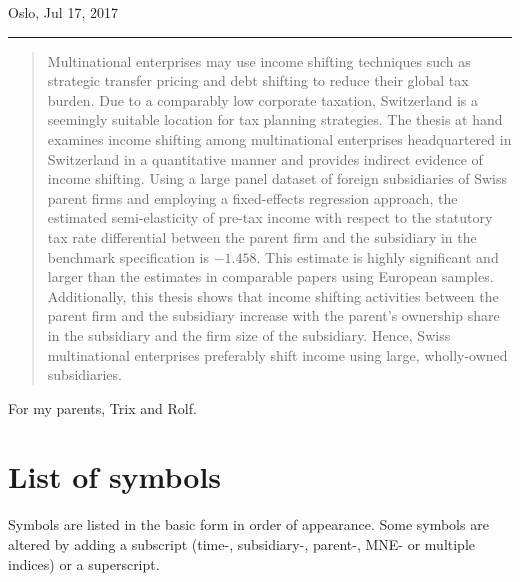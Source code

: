 \documentclass[10pt,twocolumn,oneside,cmyk]{article}
\begin{document}
\begin{titlingpage}
\begin{center}
     Oslo, Jul 17, 2017
     \vspace{0.5cm}
    \end{center}
    \hrule
    \begin{abstract}
Multinational enterprises may use income shifting techniques such as strategic transfer pricing and debt shifting to reduce their global tax burden. Due to a comparably low corporate taxation, Switzerland is a seemingly suitable location for tax planning strategies. The thesis at hand examines income shifting among multinational enterprises headquartered in Switzerland in a quantitative manner and provides indirect evidence of income shifting. Using a large panel dataset of foreign subsidiaries of Swiss parent firms and employing a fixed-effects regression approach, the estimated semi-elasticity of pre-tax income with respect to the statutory tax rate differential between the parent firm and the subsidiary in the benchmark specification is $-1.458$. This estimate is highly significant and larger than the estimates in comparable papers using European samples. Additionally, this thesis shows that income shifting activities between the parent firm and the subsidiary increase with the parent's ownership share in the subsidiary and the firm size of the subsidiary. Hence, Swiss multinational enterprises preferably shift income using large, wholly-owned subsidiaries.
  \end{abstract}
 \restoregeometry
\end{titlingpage}

\onecolumn
  \begin{center}
   For my parents, Trix and Rolf.
  \end{center}
\clearpage

\tableofcontents
\newpage

\listoffigures
\listoftables
\clearpage

\section*{List of symbols}
Symbols are listed in the basic form in order of appearance. Some symbols are altered by adding a subscript (time-, subsidiary-, parent-, MNE- or multiple indices) or a superscript.\\
\end{document}
